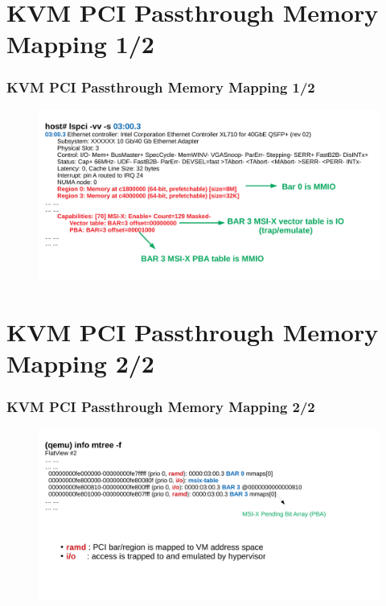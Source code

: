 \documentclass[aspectratio=169]{beamer}
\begin{document}

\section{KVM PCI Passthrough Memory Mapping 1/2}
\begin{frame}
\frametitle{KVM PCI Passthrough Memory Mapping 1/2}
\begin{figure}
\includegraphics[width=1.0\linewidth]{figures/lspci.pdf}
\end{figure}
\end{frame}


\section{KVM PCI Passthrough Memory Mapping 2/2}
\begin{frame}
\frametitle{KVM PCI Passthrough Memory Mapping 2/2}
\begin{figure}
\includegraphics[width=1.0\linewidth]{figures/flatview.pdf}
\end{figure}
\end{frame}
\end{document}
